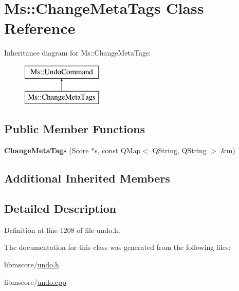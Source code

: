 \hypertarget{class_ms_1_1_change_meta_tags}{}\section{Ms\+:\+:Change\+Meta\+Tags Class Reference}
\label{class_ms_1_1_change_meta_tags}
Inheritance diagram for Ms\+:\+:Change\+Meta\+Tags\+:\begin{figure}[H]
\begin{center}
\leavevmode
\includegraphics[height=2.000000cm]{class_ms_1_1_change_meta_tags}
\end{center}
\end{figure}
\subsection*{Public Member Functions}
\begin{DoxyCompactItemize}
\item 
\mbox{\label{class_ms_1_1_change_meta_tags_ae8c86db2f4e7adc19ecd2376bd358c79}} 
{\bfseries Change\+Meta\+Tags} (\hyperlink{class_ms_1_1_score}{Score} $\ast$s, const Q\+Map$<$ Q\+String, Q\+String $>$ \&m)
\end{DoxyCompactItemize}
\subsection*{Additional Inherited Members}


\subsection{Detailed Description}


Definition at line 1208 of file undo.\+h.



The documentation for this class was generated from the following files\+:\begin{DoxyCompactItemize}
\item 
libmscore/\hyperlink{undo_8h}{undo.\+h}\item 
libmscore/\hyperlink{undo_8cpp}{undo.\+cpp}\end{DoxyCompactItemize}
